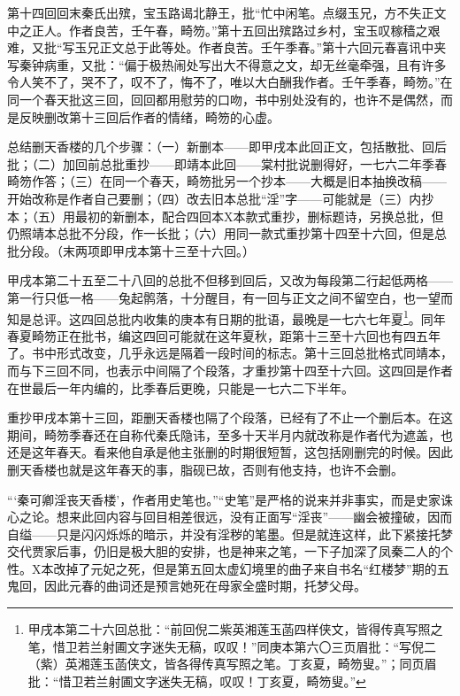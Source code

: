 \par 第十四回回末秦氏出殡，宝玉路谒北静王，批“忙中闲笔。点缀玉兄，方不失正文中之正人。作者良苦，壬午春，畸笏。”第十五回出殡路过乡村，宝玉叹稼穑之艰难，又批“写玉兄正文总于此等处。作者良苦。壬午季春。”第十六回元春喜讯中夹写秦钟病重，又批：“偏于极热闹处写出大不得意之文，却无丝毫牵强，且有许多令人笑不了，哭不了，叹不了，悔不了，唯以大白酬我作者。壬午季春，畸笏。”在同一个春天批这三回，回回都用慰劳的口吻，书中别处没有的，也许不是偶然，而是反映删改第十三回后作者的情绪，畸笏的心虚。
\par 总结删天香楼的几个步骤：（一）新删本——即甲戌本此回正文，包括散批、回后批；（二）加回前总批重抄——即靖本此回——棠村批说删得好，一七六二年季春畸笏作答；（三）在同一个春天，畸笏批另一个抄本——大概是旧本抽换改稿——开始改称是作者自己要删；（四）改去旧本总批“淫”字——可能就是（三）内抄本；（五）用最初的新删本，配合四回本X本款式重抄，删标题诗，另换总批，但仍照靖本总批不分段，作一长批；（六）用同一款式重抄第十四至十六回，但是总批分段。（末两项即甲戌本第十三至十六回。）
\par 甲戌本第二十五至二十八回的总批不但移到回后，又改为每段第二行起低两格——第一行只低一格——兔起鹘落，十分醒目，有一回与正文之间不留空白，也一望而知是总评。这四回总批内收集的庚本有日期的批语，最晚是一七六七年夏\footnote{甲戌本第二十六回总批：“前回倪二紫英湘莲玉菡四样侠文，皆得传真写照之笔，惜卫若兰射圃文字迷失无稿，叹叹！”同庚本第六〇三页眉批：“写倪二（紫）英湘莲玉菡侠文，皆各得传真写照之笔。丁亥夏，畸笏叟。”；同页眉批：“惜卫若兰射圃文字迷失无稿，叹叹！丁亥夏，畸笏叟。”}。同年春夏畸笏正在批书，编这四回可能就在这年夏秋，距第十三至十六回也有四五年了。书中形式改变，几乎永远是隔着一段时间的标志。第十三回总批格式同靖本，而与下三回不同，也表示中间隔了个段落，才重抄第十四至十六回。这四回是作者在世最后一年内编的，比季春后更晚，只能是一七六二下半年。
\par 重抄甲戌本第十三回，距删天香楼也隔了个段落，已经有了不止一个删后本。在这期间，畸笏季春还在自称代秦氏隐讳，至多十天半月内就改称是作者代为遮盖，也还是这年春天。看来他自承是他主张删的时期很短暂，这包括刚删完的时候。因此删天香楼也就是这年春天的事，脂砚已故，否则有他支持，也许不会删。
\par “‘秦可卿淫丧天香楼’，作者用史笔也。”“史笔”是严格的说来并非事实，而是史家诛心之论。想来此回内容与回目相差很远，没有正面写“淫丧”——幽会被撞破，因而自缢——只是闪闪烁烁的暗示，并没有淫秽的笔墨。但是就连这样，此下紧接托梦交代贾家后事，仍旧是极大胆的安排，也是神来之笔，一下子加深了凤秦二人的个性。X本改掉了元妃之死，但是第五回太虚幻境里的曲子来自书名“红楼梦”期的五鬼回，因此元春的曲词还是预言她死在母家全盛时期，托梦父母。
